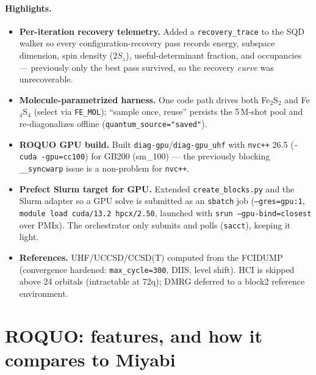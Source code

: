 \documentclass[11pt]{article}
\begin{document}
\paragraph{Highlights.}
\begin{itemize}
  \item \textbf{Per-iteration recovery telemetry.} Added a \texttt{recovery\_trace} to the SQD
        walker so every configuration-recovery pass records energy, subspace dimension, spin
        density ($2S_z$), useful-determinant fraction, and occupancies --- previously only the
        best pass survived, so the recovery \emph{curve} was unrecoverable.
  \item \textbf{Molecule-parametrized harness.} One code path drives both Fe$_2$S$_2$ and
        Fe$_4$S$_4$ (select via \texttt{FE\_MOL}); ``sample once, reuse'' persists the 5\,M-shot
        pool and re-diagonalizes offline (\texttt{quantum\_source="saved"}).
  \item \textbf{ROQUO GPU build.} Built \texttt{diag-gpu}/\texttt{diag-gpu\_uhf} with
        \texttt{nvc++} 26.5 (\texttt{-cuda -gpu=cc100}) for GB200 (sm\_100) --- the previously
        blocking \texttt{\_\_syncwarp} issue is a non-problem for \texttt{nvc++}.
  \item \textbf{Prefect Slurm target for GPU.} Extended \texttt{create\_blocks.py} and the Slurm
        adapter so a GPU solve is submitted as an \texttt{sbatch} job (\texttt{--gres=gpu:1},
        \texttt{module load cuda/13.2 hpcx/2.50}, launched with \texttt{srun --gpu-bind=closest}
        over PMIx). The orchestrator only submits and polls (\texttt{sacct}), keeping it light.
  \item \textbf{References.} UHF/UCCSD/CCSD(T) computed from the FCIDUMP (convergence hardened:
        \texttt{max\_cycle=300}, DIIS, level shift). HCI is skipped above 24 orbitals
        (intractable at 72q); DMRG deferred to a block2 reference environment.
\end{itemize}

\section{ROQUO: features, and how it compares to Miyabi}
\end{document}
